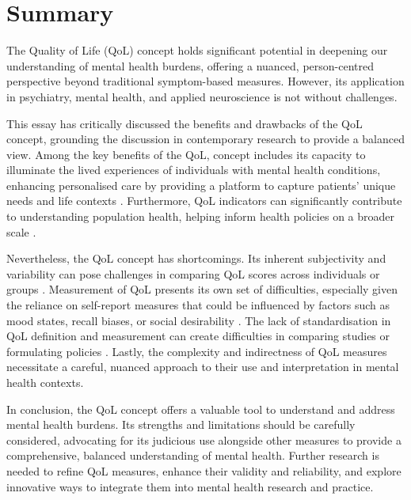 \documentclass[10pt]{article}
\begin{document}
\begin{sloppypar}
  \section{Summary}
  \label{sec:summary}

  The Quality of Life (QoL) concept holds significant potential in deepening our understanding of mental health burdens, offering a nuanced, person-centred perspective beyond traditional symptom-based measures. However, its application in psychiatry, mental health, and applied neuroscience is not without challenges.

  \newpage

  This essay has critically discussed the benefits and drawbacks of the QoL concept, grounding the discussion in contemporary research to provide a balanced view. Among the key benefits of the QoL, concept includes its capacity to illuminate the lived experiences of individuals with mental health conditions, enhancing personalised care by providing a platform to capture patients' unique needs and life contexts
  \citep{dwamena_interventions_2012,endicott_quality_1993}. Furthermore, QoL indicators can significantly contribute to understanding population health, helping inform health policies on a broader scale
  \citep{gbd_2017_disease_and_injury_incidence_and_prevalence_collaborators_global_2018}.

  Nevertheless, the QoL concept has shortcomings. Its inherent subjectivity and variability can pose challenges in comparing QoL scores across individuals or groups \citep{skevington_expecting_2012}. Measurement of QoL presents its own set of difficulties, especially given the reliance on self-report measures that could be influenced by factors such as mood states, recall biases, or social desirability \citep{bowling_just_2005}. The lack of standardisation in QoL definition and measurement can create difficulties in comparing studies or formulating policies \citep{matarazzo_behavioral_1980}. Lastly, the complexity and indirectness of QoL measures necessitate a careful, nuanced approach to their use and interpretation in mental health contexts.

  In conclusion, the QoL concept offers a valuable tool to understand and address mental health burdens. Its strengths and limitations should be carefully considered, advocating for its judicious use alongside other measures to provide a comprehensive, balanced understanding of mental health. Further research is needed to refine QoL measures, enhance their validity and reliability, and explore innovative ways to integrate them into mental health research and practice.

  \pagebreak
  \singlespacing %
  
  

\end{sloppypar}
\end{document}
